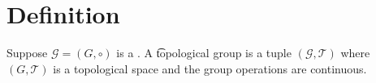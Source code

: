 
\section*{Definition}

Suppose $\mathcal{G}  = (G, \circ)$ is a .
A \t{topological group} is a tuple $(\mathcal{G} , \mathcal{T} )$ where $(G, \mathcal{T} )$ is a topological space and the group operations are continuous.

\blankpage